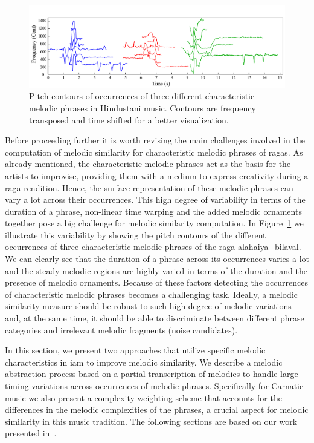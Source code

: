 \begin{figure}
	\begin{center}
		\includegraphics[width=\figSizeHundred]{ch06_patterns/figures/ImprovingSimilarity/phraseClassesExample.pdf}
	\end{center}
	\caption[Examples of different occurrences of the \gls{raga} motifs]{Pitch contours of occurrences of three different characteristic melodic phrases in Hindustani music. Contours are frequency transposed and time shifted for a better visualization.}
	\label{fig:phraseComplexityExample}
\end{figure}

Before proceeding further it is worth revising the main challenges involved in the computation of melodic similarity for characteristic melodic phrases of \glspl{raga}. As already mentioned, the characteristic melodic phrases act as the basis for the artists to improvise, providing them with a medium to express creativity during a \gls{raga} rendition. Hence, the surface representation of these melodic phrases can vary a lot across their occurrences. This high degree of variability in terms of the duration of a phrase, non-linear time warping and the added melodic ornaments together pose a big challenge for melodic similarity computation. In Figure~\ref{fig:phraseComplexityExample} we illustrate this variability by showing the pitch contours of the different occurrences of three characteristic melodic phrases of the \gls{raga} \gls{alahaiya_bilaval}. We can clearly see that the duration of a phrase across its occurrences varies a lot and the steady melodic regions are highly varied in terms of the duration and the presence of melodic ornaments. Because of these factors detecting the occurrences of characteristic melodic phrases becomes a challenging task. Ideally, a melodic similarity measure should be robust to such high degree of melodic variations and, at the same time, it should be able to discriminate between different phrase categories and irrelevant melodic fragments (noise candidates).

In this section, we present two approaches that utilize specific melodic characteristics in \gls{iam} to improve melodic similarity. We describe a melodic abstraction process based on a partial transcription of melodies to handle large timing variations across occurrences of melodic phrases. Specifically for Carnatic music we also present a complexity weighting scheme that accounts for the differences in the melodic complexities of the phrases, a crucial aspect for melodic similarity in this music tradition. The following sections are based on our work presented in~\cite{gulati_ISMIR_2015}.

